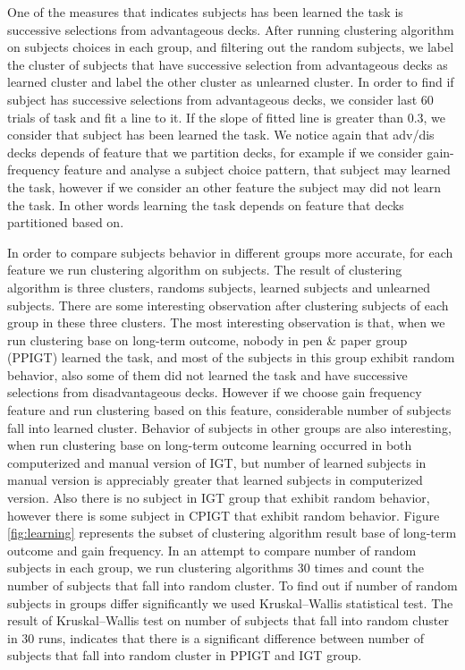 \documentclass[12pt,twocolumn]{elsarticle}
\begin{document}
One of the measures that indicates subjects has been learned
the task is successive selections from advantageous decks.
After running clustering algorithm on subjects choices in
each group, and filtering out the random subjects, we label
the cluster of subjects that have successive selection from
advantageous decks as learned cluster and label the other
cluster as unlearned cluster. In order to find if subject
has successive selections from advantageous decks, we
consider last 60 trials of task and fit a line to it. If the
slope of fitted line is greater than 0.3, we consider that
subject has been learned the task. We notice again that
adv/dis decks depends of feature that we partition decks,
for example if we consider gain-frequency feature and
analyse a subject choice pattern, that subject may learned
the task, however if we consider an other feature the
subject may did not learn the task. In other words learning
the task depends on feature that decks partitioned based on.

In order to compare subjects behavior in different groups
more accurate, for each feature we run clustering algorithm
on subjects. The result of clustering algorithm is three
clusters, randoms subjects, learned subjects and unlearned
subjects. There are some interesting observation after
clustering subjects of each group in these three clusters.
The most interesting observation is that, when we run
clustering base on long-term outcome, nobody in pen \& paper group
(PPIGT) learned the task, and most of the subjects in this group
exhibit random behavior, also some of them did not
learned the task and have successive selections from
disadvantageous decks. However if we choose gain frequency
feature and run clustering based on this feature,
considerable number of subjects fall into learned cluster.
Behavior of subjects in other groups are also interesting,
when run clustering base on long-term outcome learning
occurred in both computerized and manual version of IGT, but number of
learned subjects in manual version is appreciably greater that learned
subjects in computerized version. Also there is no subject in IGT group
that exhibit random behavior, however there is some subject in CPIGT
that exhibit random behavior. Figure \ref{fig:learning} represents the
subset of clustering algorithm result base of long-term outcome and gain
frequency.  In an attempt to compare number of random subjects in each
group, we run clustering algorithms 30 times and count the number of
subjects that fall into random cluster. To find out if number of random
subjects in groups differ significantly we used Kruskal–Wallis statistical test.
The result of Kruskal–Wallis test on number of subjects that fall into random
cluster in 30 runs, indicates that there is a significant difference
between number of subjects that fall into random cluster in PPIGT and
IGT group.
\end{document}
